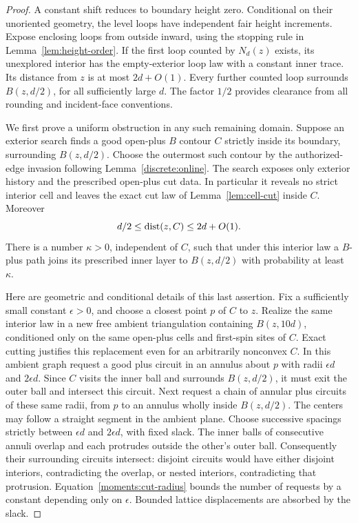 \begin{proof}
A constant shift reduces to boundary height zero.  Conditional on their
unoriented geometry, the level loops have independent fair height
increments.  Expose enclosing loops from outside inward, using the
stopping rule in Lemma~\ref{lem:height-order}.  If the first loop counted
by $N_d(z)$ exists, its unexplored interior has the empty-exterior loop
law with a constant inner trace.  Its distance from $z$ is at most
$2d+O(1)$.  Every further counted loop surrounds $B(z,d/2)$, for all
sufficiently large $d$.  The factor $1/2$ provides clearance from all
rounding and incident-face conventions.

We first prove a uniform obstruction in any such remaining domain.
Suppose an exterior search finds a good open-plus $B$ contour $C$ strictly
inside its boundary, surrounding $B(z,d/2)$.  Choose the outermost such
contour by the authorized-edge invasion following
Lemma~\ref{discrete:online}.  The search exposes only exterior
history and the prescribed open-plus cut data.  In particular it reveals
no strict interior cell and leaves the exact cut law of
Lemma~\ref{lem:cell-cut} inside $C$.  Moreover
\begin{equation}\label{moments:cut-radius}
 d/2\leq\operatorname{dist}(z,C)\leq2d+O(1).
\end{equation}
There is a number $\kappa>0$, independent of $C$, such that under this
interior law a $B$-plus path joins its prescribed inner layer to
$B(z,d/2)$ with probability at least $\kappa$.

Here are geometric and conditional details of this last assertion.
Fix a sufficiently small constant $\epsilon>0$, and choose a closest
point $p$ of $C$ to $z$.  Realize the same interior law in a new free
ambient triangulation containing $B(z,10d)$, conditioned only on the
same open-plus cells and first-spin sites of $C$.  Exact cutting
justifies this replacement even for an arbitrarily nonconvex $C$.
In this ambient graph request a good plus circuit in an annulus about
$p$ with radii $\epsilon d$ and $2\epsilon d$.  Since $C$ visits the
inner ball and surrounds $B(z,d/2)$, it must exit the outer ball and
intersect this circuit.  Next request a chain of annular plus circuits
of these same radii, from $p$ to an annulus wholly inside $B(z,d/2)$.
The centers may follow a straight segment in the ambient plane.  Choose
successive spacings strictly between $\epsilon d$ and $2\epsilon d$,
with fixed slack.  The inner balls of consecutive annuli overlap and
each protrudes outside the other's outer ball.  Consequently their
surrounding circuits intersect: disjoint circuits would have either
disjoint interiors, contradicting the overlap, or nested interiors,
contradicting that protrusion.  Equation~\eqref{moments:cut-radius}
bounds the number of requests by a constant depending only on
$\epsilon$.  Bounded lattice displacements are absorbed by the slack.


\end{proof}
